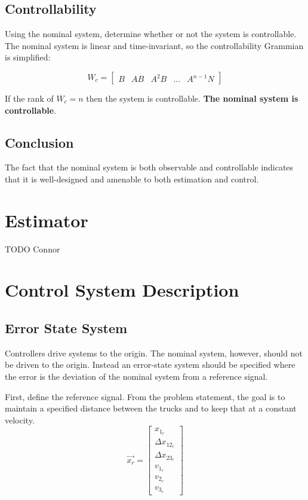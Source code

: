 \documentclass[12pt,onecolumn,reqno]{amsart}
\begin{document}
\subsection{Controllability}
Using the nominal system, determine whether or not the system is controllable. The
nominal system is linear and time-invariant, so the controllability Grammian is
simplified:

\begin{equation}
  W_{c} = 
  \begin{bmatrix}
    B & AB & A^2B & \hdots & A^{n-1}N
  \end{bmatrix}
\end{equation}

If the rank of $W_{c} = n$ then the system is controllable. \textbf{The nominal
system is controllable}.

\subsection{Conclusion}
The fact that the nominal system is both observable and controllable indicates
that it is well-designed and amenable to both estimation and control.


\section{Estimator} \label{sec:kalman_filter}
TODO Connor

\section{Control System Description}
\subsection{Error State System}
Controllers drive systems to the origin. The nominal system, however, should not
be driven to the origin. Instead an error-state system should be specified where
the error is the deviation of the nominal system from a reference signal.

First, define the reference signal. From the problem statement, the goal is to
maintain a specified distance between the trucks and to keep that at a constant
velocity.
\begin{equation}
  \vec{x_{r}} = 
  \begin{bmatrix}
    x_{1_{r}}         \\
    \Delta x_{12_{r}} \\
    \Delta x_{23_{r}} \\
    v_{1_{r}}         \\
    v_{2_{r}}         \\
    v_{3_{r}}
  \end{bmatrix}
\end{equation}
\end{document}
